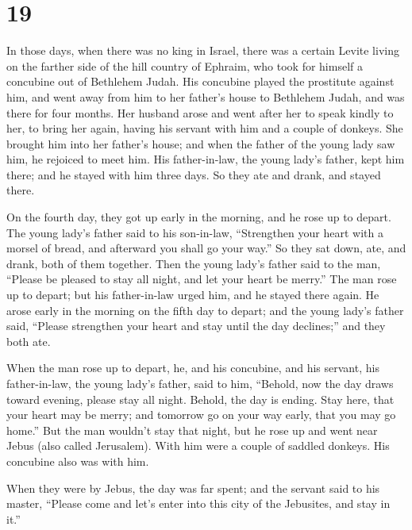 \hypertarget{section-18}{%
\section{19}\label{section-18}}

 In those days, when there was no king in Israel, there
was a certain Levite living on the farther side of the hill country of
Ephraim, who took for himself a concubine out of Bethlehem Judah.
 His concubine played the prostitute against him, and went
away from him to her father's house to Bethlehem Judah, and was there
for four months.  Her husband arose and went after her to
speak kindly to her, to bring her again, having his servant with him and
a couple of donkeys. She brought him into her father's house; and when
the father of the young lady saw him, he rejoiced to meet him.
 His father-in-law, the young lady's father, kept him
there; and he stayed with him three days. So they ate and drank, and
stayed there.

 On the fourth day, they got up early in the morning, and
he rose up to depart. The young lady's father said to his son-in-law,
``Strengthen your heart with a morsel of bread, and afterward you shall
go your way.''  So they sat down, ate, and drank, both of
them together. Then the young lady's father said to the man, ``Please be
pleased to stay all night, and let your heart be merry.'' 
The man rose up to depart; but his father-in-law urged him, and he
stayed there again.  He arose early in the morning on the
fifth day to depart; and the young lady's father said, ``Please
strengthen your heart and stay until the day declines;'' and they both
ate.

 When the man rose up to depart, he, and his concubine,
and his servant, his father-in-law, the young lady's father, said to
him, ``Behold, now the day draws toward evening, please stay all night.
Behold, the day is ending. Stay here, that your heart may be merry; and
tomorrow go on your way early, that you may go home.'' 
But the man wouldn't stay that night, but he rose up and went near Jebus
(also called Jerusalem). With him were a couple of saddled donkeys. His
concubine also was with him.

 When they were by Jebus, the day was far spent; and the
servant said to his master, ``Please come and let's enter into this city
of the Jebusites, and stay in it.''


